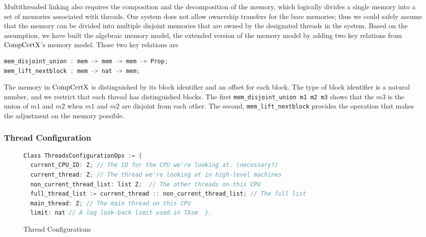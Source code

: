 
Multithreaded linking also requires the composition and the decomposition of the memory,
which logically divides a single memory into a set of memories associated with threads.
Our system does not allow ownership transfers for the bare memories; thus we could safely assume that the memory can be divided into multiple disjoint memories that are owned by the designated threads in the system. 
Based on the assumption, 
we have built the algebraic memory model, the extended version of the memory model by adding two key relations from $\mathrm{CompCertX}$'s memory model.
Those two key relations are 
\begin{lstlisting}[language=C]
mem_disjoint_union : mem -> mem -> mem -> Prop;
mem_lift_nextblock : mem -> nat -> mem;
\end{lstlisting}
The memory in $\mathrm{CompCertX}$ is distinguished by its block identifier and an offset for each block. 
The type of block identifier is a natural number,
and we restrict that each thread has distinguished blocks.  
The first \lstinline$mem_disjoint_union m1 m2 m3$  shows that 
the $m3$ is the union of $m1$ and $m2$ when $m1$ and $m2$ 
are disjoint from each other. 
The second, \lstinline$mem_lift_nextblock$ 
provides the operation that makes the adjustment on the memory possible. 


\subsubsection{Thread Configuration}

\begin{figure}
\begin{lstlisting}[language=C, morekeywords={Class}]
Class ThreadsConfigurationOps := {      
  current_CPU_ID: Z; // The ID for the CPU we're looking at. (necessary?) 
  current_thread: Z; // The thread we're looking at in high-level machines
  non_current_thread_list: list Z;  // The other threads on this CPU 
  full_thread_list := current_thread :: non_current_thread_list; // The full list
  main_thread: Z; // The main thread on this CPU 
  limit: nat // A log look-back limit used in TAsm  }.
\end{lstlisting}
\caption{Thread Configurations}
\label{fig:chapter:linking:thread-configurations}
\end{figure}


